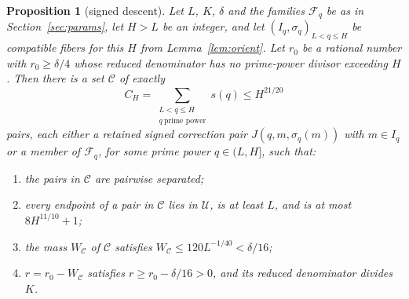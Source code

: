 \documentclass[11pt,letterpaper]{article}
\numberwithin{equation}{section}
\theoremstyle{plain}
\newtheorem{proposition}{Proposition}
\theoremstyle{remark}
\newcommand{\cF}{\mathcal F}
\newcommand{\cU}{\mathcal U}
\newcommand{\cC}{\mathcal C}
\begin{document}
\begin{proposition}[signed descent]\label{prop:descent}
Let $L$, $K$, $\delta$ and the families $\cF_q$ be as in Section~\ref{sec:params}, let $H>L$ be an integer, and let $(I_q,\sigma_q)_{L<q\le H}$ be compatible fibers for this $H$ from Lemma~\ref{lem:orient}. Let $r_0$ be a rational number with $r_0\ge\delta/4$ whose reduced denominator has no prime-power divisor exceeding $H$. Then there is a set $\cC$ of exactly
\begin{equation}\label{eq:CH}
C_H=\sum_{\substack{L<q\le H\\ q\ \text{prime power}}}s(q)\le H^{21/20}
\end{equation}
pairs, each either a retained signed correction pair $J(q,m,\sigma_q(m))$ with $m\in I_q$ or a member of $\cF_q$, for some prime power $q\in(L,H]$, such that:
\begin{enumerate}
\item[(i)] the pairs in $\cC$ are pairwise separated;
\item[(ii)] every endpoint of a pair in $\cC$ lies in $\cU$, is at least $L$, and is at most $8H^{11/10}+1$;
\item[(iii)] the mass $W_{\cC}$ of $\cC$ satisfies $W_{\cC}\le120L^{-1/40}<\delta/16$;
\item[(iv)] $r=r_0-W_{\cC}$ satisfies $r\ge r_0-\delta/16>0$, and its reduced denominator divides $K$.
\end{enumerate}
\end{proposition}
\end{document}
